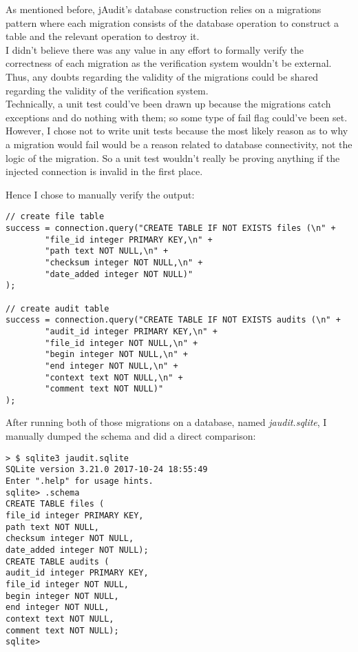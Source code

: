 \documentclass[9pt]{article}
\renewenvironment{framed}[1][\hsize]
   {\MakeFramed{\hsize#1\advance\hsize-\width \FrameRestore}}%
   {\endMakeFramed}
\begin{document}
		As mentioned before, jAudit's database construction relies on a
		migrations pattern where each migration consists of the database
		operation to construct a table and the relevant operation to destroy
		it.\\
		
		I didn't believe there was any value in any effort to formally verify
		the correctness of each migration as the verification system wouldn't be
		external. Thus, any doubts regarding the validity of the migrations
		could be shared regarding the validity of the verification system.\\

		Technically, a unit test could've been drawn up because the migrations
		catch exceptions and do nothing with them; so some type
		of fail flag could've been set. However, I chose not to write unit tests
		because the most likely reason as to why a migration would fail would be
		a reason related to database connectivity, not the logic of the
		migration. So a unit test wouldn't really be proving anything if the
		injected connection is invalid in the first place.
		
		Hence I chose to manually verify the output:

		\begin{framed}[1.2\textwidth]	
			\begin{verbatim}
// create file table
success = connection.query("CREATE TABLE IF NOT EXISTS files (\n" +
		"file_id integer PRIMARY KEY,\n" +
		"path text NOT NULL,\n" +
		"checksum integer NOT NULL,\n" +
		"date_added integer NOT NULL)"
);

// create audit table
success = connection.query("CREATE TABLE IF NOT EXISTS audits (\n" +
		"audit_id integer PRIMARY KEY,\n" +
		"file_id integer NOT NULL,\n" +
		"begin integer NOT NULL,\n" +
		"end integer NOT NULL,\n" +
		"context text NOT NULL,\n" +
		"comment text NOT NULL)"
);
			\end{verbatim}
		\end{framed}

		After running both of those migrations on a database, named
		\textit{jaudit.sqlite}, I manually dumped the schema and did a direct
		comparison:\\
		
		\begin{framed}[\textwidth]
			\begin{lstlisting}
> $ sqlite3 jaudit.sqlite                                                                                                                                                                                                                   
SQLite version 3.21.0 2017-10-24 18:55:49
Enter ".help" for usage hints.
sqlite> .schema
CREATE TABLE files (
file_id integer PRIMARY KEY,
path text NOT NULL,
checksum integer NOT NULL,
date_added integer NOT NULL);
CREATE TABLE audits (
audit_id integer PRIMARY KEY,
file_id integer NOT NULL,
begin integer NOT NULL,
end integer NOT NULL,
context text NOT NULL,
comment text NOT NULL);
sqlite> 
			\end{lstlisting}
		\end{framed} 
\end{document}
